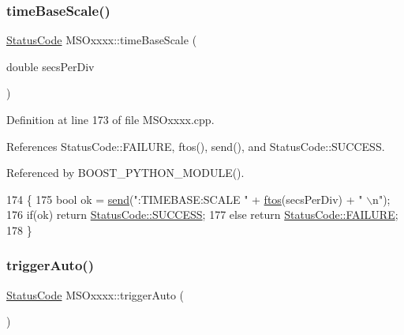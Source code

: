 \subsubsection{\texorpdfstring{time\+Base\+Scale()}{timeBaseScale()}}
{\footnotesize\ttfamily \hyperlink{classStatusCode}{Status\+Code} M\+S\+Oxxxx\+::time\+Base\+Scale (\begin{DoxyParamCaption}\item[{double}]{secs\+Per\+Div }\end{DoxyParamCaption})}



Definition at line 173 of file M\+S\+Oxxxx.\+cpp.



References Status\+Code\+::\+F\+A\+I\+L\+U\+RE, ftos(), send(), and Status\+Code\+::\+S\+U\+C\+C\+E\+SS.



Referenced by B\+O\+O\+S\+T\+\_\+\+P\+Y\+T\+H\+O\+N\+\_\+\+M\+O\+D\+U\+L\+E().


\begin{DoxyCode}
174 \{
175     \textcolor{keywordtype}{bool} ok = \hyperlink{classMSOxxxx_ae77668a1ae4ccb74e0ed5f2485dfdebf}{send}(\textcolor{stringliteral}{":TIMEBASE:SCALE "} + \hyperlink{classMSOxxxx_ab9c897c3dc0a52cbe5a5da67fc520ed7}{ftos}(secsPerDiv) + \textcolor{stringliteral}{" \(\backslash\)n"});
176     \textcolor{keywordflow}{if}(ok)  \textcolor{keywordflow}{return} \hyperlink{classStatusCode_a6f565cbeadc76d14c72f047e5e85eb4badd0da38d3ba0d922efd1f4619bc37ad8}{StatusCode::SUCCESS};
177     \textcolor{keywordflow}{else}        \textcolor{keywordflow}{return} \hyperlink{classStatusCode_a6f565cbeadc76d14c72f047e5e85eb4ba3da73d4c469762eb9d3c960368252b26}{StatusCode::FAILURE};  
178 \}
\end{DoxyCode}
\mbox{\label{classMSOxxxx_a44238c713464e76d4c3c2005413bdf76}} 
\subsubsection{\texorpdfstring{trigger\+Auto()}{triggerAuto()}}
{\footnotesize\ttfamily \hyperlink{classStatusCode}{Status\+Code} M\+S\+Oxxxx\+::trigger\+Auto (\begin{DoxyParamCaption}{ }\end{DoxyParamCaption})}



